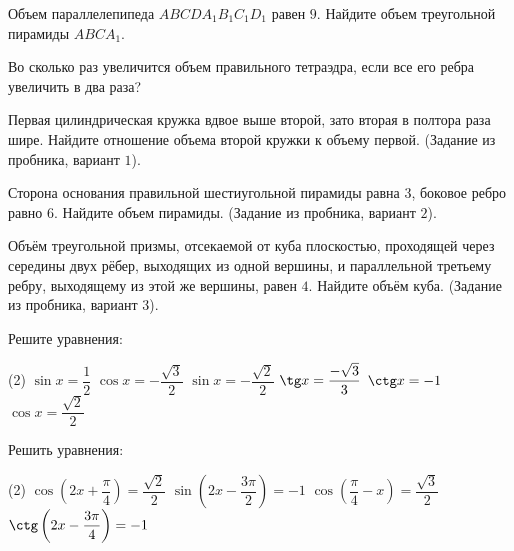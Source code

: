 \begin{class}[number=1]
\begin{listofex}
		\item Объем параллелепипеда \(ABCDA_1B_1C_1D_1\) равен \(9\). Найдите объем треугольной пирамиды \(ABCA_1\).
		\item Во сколько раз увеличится объем правильного тетраэдра, если все его ребра увеличить в два раза?
		\item Первая цилиндрическая кружка вдвое выше второй, зато вторая в полтора раза шире. Найдите отношение объема второй кружки к объему первой. (Задание из пробника, вариант \( 1 \)).
		\item Сторона основания правильной шестиугольной пирамиды равна \( 3 \), боковое ребро равно \( 6 \).	Найдите объем пирамиды. (Задание из пробника, вариант \( 2 \)).
		\item Объём треугольной призмы, отсекаемой от куба плоскостью, проходящей через середины двух рёбер, выходящих из одной вершины, и параллельной третьему ребру, выходящему из	этой же вершины, равен \( 4 \). Найдите объём куба. (Задание из пробника, вариант \( 3 \)).
		\item Решите уравнения:
		\begin{tasks}(2)
			\task \( \sin x=\dfrac{1}{2} \)
			\task \( \cos x=-\dfrac{\sqrt{3}}{2} \)
			\task \( \sin x = -\dfrac{\sqrt{2}}{2} \)
			\task \( \tg x = \dfrac{-\sqrt{3}}{3} \)
			\task \( \ctg x = -1 \)
			\task \( \cos x = \dfrac{\sqrt{2}}{2} \)
		\end{tasks}
		\item Решить уравнения:
		\begin{tasks}(2)
			\task \( \cos\left( 2x+\dfrac{\pi}{4} \right)=\dfrac{\sqrt{2}}{2} \)
			\task \( \sin \left( 2x-\dfrac{3\pi}{2} \right) = -1 \)
			\task \( \cos \left( \dfrac{\pi}{4}-x \right)=\dfrac{\sqrt{3}}{2} \)
			\task \( \ctg\left( 2x-\dfrac{3\pi}{4} \right)=-1 \)
		\end{tasks}
	\end{listofex}
\end{class}

